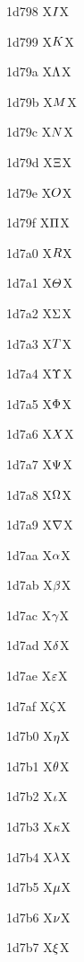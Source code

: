 \documentclass[11pt]{article}
\begin{document}
1d798 X{\ensuremath{\mathsfbfsl{I}}}X

1d799 X{\ensuremath{\mathsfbfsl{K}}}X

1d79a X{\ensuremath{\mathsfbfsl{\Lambda}}}X

1d79b X{\ensuremath{\mathsfbfsl{M}}}X

1d79c X{\ensuremath{\mathsfbfsl{N}}}X

1d79d X{\ensuremath{\mathsfbfsl{\Xi}}}X

1d79e X{\ensuremath{\mathsfbfsl{O}}}X

1d79f X{\ensuremath{\mathsfbfsl{\Pi}}}X

1d7a0 X{\ensuremath{\mathsfbfsl{R}}}X

1d7a1 X{\ensuremath{\mathsfbfsl{\varTheta}}}X

1d7a2 X{\ensuremath{\mathsfbfsl{\Sigma}}}X

1d7a3 X{\ensuremath{\mathsfbfsl{T}}}X

1d7a4 X{\ensuremath{\mathsfbfsl{\Upsilon}}}X

1d7a5 X{\ensuremath{\mathsfbfsl{\Phi}}}X

1d7a6 X{\ensuremath{\mathsfbfsl{X}}}X

1d7a7 X{\ensuremath{\mathsfbfsl{\Psi}}}X

1d7a8 X{\ensuremath{\mathsfbfsl{\Omega}}}X

1d7a9 X{\ensuremath{\mathsfbfsl{\nabla}}}X

1d7aa X{\ensuremath{\mathsfbfsl{\alpha}}}X

1d7ab X{\ensuremath{\mathsfbfsl{\beta}}}X

1d7ac X{\ensuremath{\mathsfbfsl{\gamma}}}X

1d7ad X{\ensuremath{\mathsfbfsl{\delta}}}X

1d7ae X{\ensuremath{\mathsfbfsl{\varepsilon}}}X

1d7af X{\ensuremath{\mathsfbfsl{\zeta}}}X

1d7b0 X{\ensuremath{\mathsfbfsl{\eta}}}X

1d7b1 X{\ensuremath{\mathsfbfsl{\theta}}}X

1d7b2 X{\ensuremath{\mathsfbfsl{\iota}}}X

1d7b3 X{\ensuremath{\mathsfbfsl{\kappa}}}X

1d7b4 X{\ensuremath{\mathsfbfsl{\lambda}}}X

1d7b5 X{\ensuremath{\mathsfbfsl{\mu}}}X

1d7b6 X{\ensuremath{\mathsfbfsl{\nu}}}X

1d7b7 X{\ensuremath{\mathsfbfsl{\xi}}}X
\end{document}
